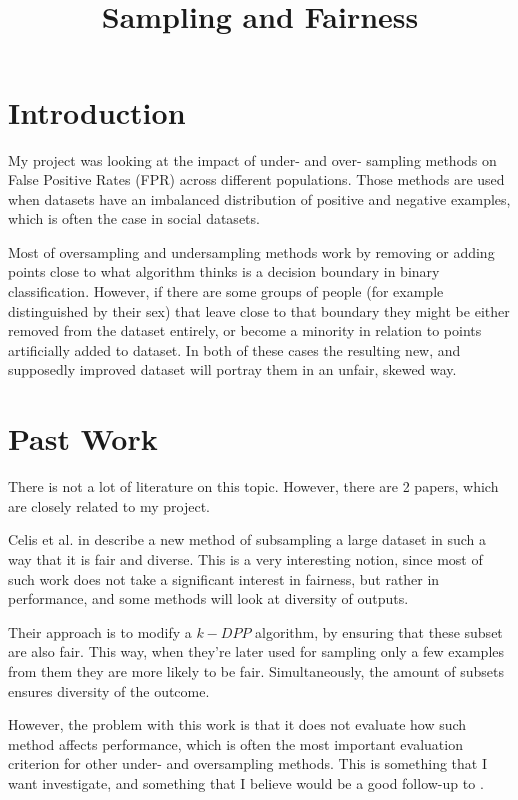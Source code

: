 \documentclass{article}
\title{
	\textmd{\textbf{\hmwkClass}\\Sampling and Fairness}\\
}
\author{\hmwkAuthorName}
\date{}
\begin{document}
\maketitle

\section{Introduction}

My project was looking at the impact of under- and over- sampling methods on False Positive Rates (FPR) across different populations. Those methods are used when datasets have an imbalanced distribution of positive and negative examples, which is often the case in social datasets.

Most of oversampling and undersampling methods work by removing or adding points close to what algorithm thinks is a decision boundary in binary classification. However, if there are some groups of people (for example distinguished by their sex) that leave close to that boundary they might be either removed from the dataset entirely, or become a minority in relation to points artificially added to dataset. In both of these cases the resulting new, and supposedly improved dataset will portray them in an unfair, skewed way.

\section{Past Work}
There is not a lot of literature on this topic. However, there are 2 papers, which are closely related to my project. 

Celis et al. in \cite{DBLP:journals/corr/CelisDKV16} describe a new method of subsampling a large dataset in such a way that it is fair and diverse. This is a very interesting notion, since most of such work does not take a significant interest in fairness, but rather in performance, and some methods will look at diversity of outputs.

Their approach is to modify a $k-DPP$ algorithm, by ensuring that these subset are also fair. This way, when they're later used for sampling only a few examples from them they are more likely to be fair. Simultaneously, the amount of subsets ensures diversity of the outcome.

However, the problem with this work is that it does not evaluate how such method affects performance, which is often the most important evaluation criterion for other under- and oversampling methods. This is something that I want investigate, and something that I believe would be a good follow-up to \cite{DBLP:journals/corr/CelisDKV16}.
\end{document}
